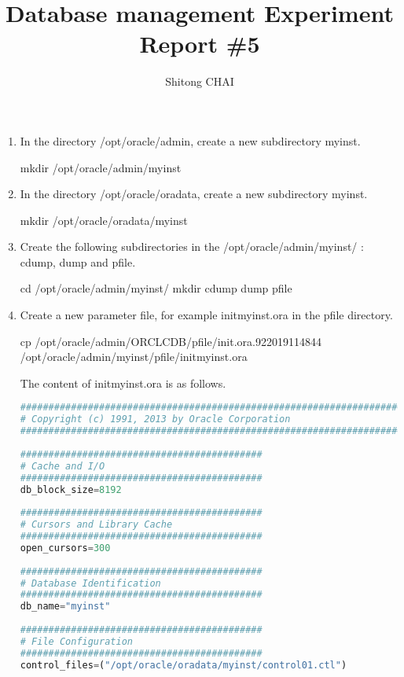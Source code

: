 \documentclass{article}
\title{Database management Experiment Report \#5}
\author{Shitong CHAI}
\date{\vspace{-5ex}}
\begin{document}
\maketitle
\begin{enumerate}
    \item In the directory /opt/oracle/admin, create a new subdirectory myinst.
        \begin{commandshell}
            mkdir /opt/oracle/admin/myinst
        \end{commandshell}

    \item In the directory /opt/oracle/oradata, create a new subdirectory myinst.
        \begin{commandshell}
            mkdir /opt/oracle/oradata/myinst
        \end{commandshell}

    \item Create the following subdirectories in the /opt/oracle/admin/myinst/ : cdump, dump and pfile.
        \begin{commandshell}
            cd /opt/oracle/admin/myinst/
            mkdir cdump dump pfile
        \end{commandshell}

    \item Create a new parameter file, for example initmyinst.ora in the pfile directory.
        \begin{commandshell}
            cp /opt/oracle/admin/ORCLCDB/pfile/init.ora.922019114844 /opt/oracle/admin/myinst/pfile/initmyinst.ora
        \end{commandshell}
        The content of initmyinst.ora is as follows.
        \begin{lstlisting}[language=python]
##############################################################################
# Copyright (c) 1991, 2013 by Oracle Corporation
##############################################################################
 
###########################################
# Cache and I/O
###########################################
db_block_size=8192
 
###########################################
# Cursors and Library Cache
###########################################
open_cursors=300
 
###########################################
# Database Identification
###########################################
db_name="myinst"
 
###########################################
# File Configuration
###########################################
control_files=("/opt/oracle/oradata/myinst/control01.ctl")
 

\end{lstlisting}
\end{enumerate}
\end{document}
